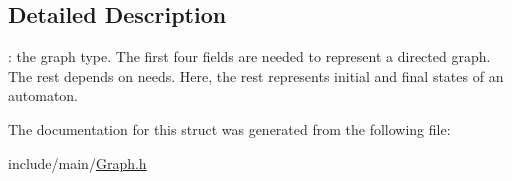\subsection{Detailed Description}
\+: the graph type. The first four fields are needed to represent a directed graph. The rest depends on needs. Here, the rest represents initial and final states of an automaton. 

The documentation for this struct was generated from the following file\+:\begin{DoxyCompactItemize}
\item 
include/main/\hyperlink{Graph_8h}{Graph.\+h}\end{DoxyCompactItemize}
